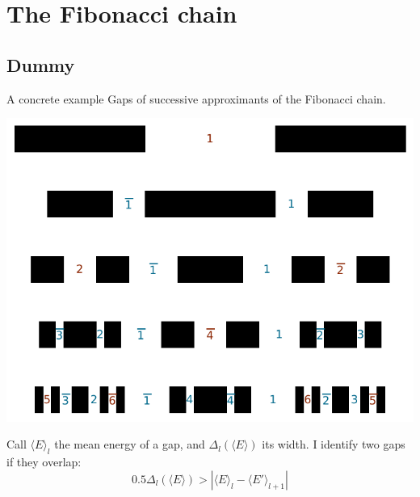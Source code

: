 \documentclass[xcolor=x11names,compress,professionalfonts]{beamer}
\renewcommand{\(}{\begin{columns}}
\renewcommand{\)}{\end{columns}}
\newcommand{\<}[1]{\begin{column}{#1}}
\renewcommand{\>}{\end{column}}
\newcommand{\me}{\ensuremath{\langle E \rangle}}
\newcommand{\mep}{\ensuremath{\langle E' \rangle}}
\begin{document}
\section{The Fibonacci chain}
\subsection{Dummy}

\begin{frame}{A concrete example}
Gaps of successive approximants of the Fibonacci chain.

{\centering
\includegraphics[scale=.6]{img/gap_labels.pdf}

}
Call $\me_l$ the mean energy of a gap, and $\Delta_l(\me)$ its width. 
I identify two gaps if they overlap:
\[
	0.5 \Delta_l(\me) > |\me_l - \mep_{l+1}|
\]
\end{frame}
\end{document}
